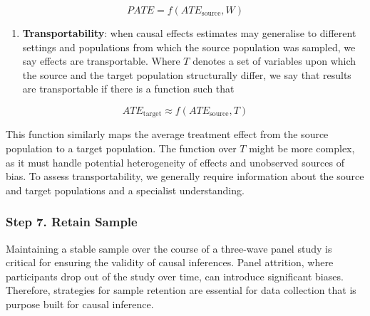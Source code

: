\documentclass[
  singlecolumn,
  9pt]{article}
\providecommand{\tightlist}{%
  \setlength{\itemsep}{0pt}\setlength{\parskip}{0pt}}\usepackage{longtable,booktabs,array}
\begin{document}
\[PATE =  f(ATE_{\text{source}}, W)\]

\begin{enumerate}
\def\labelenumi{\arabic{enumi}.}
\setcounter{enumi}{3}
\tightlist
\item
  \textbf{Transportability}: when causal effects estimates may
  generalise to different settings and populations from which the source
  population was sampled, we say effects are transportable. Where \(T\)
  denotes a set of variables upon which the source and the target
  population structurally differ, we say that results are transportable
  if there is a function such that
\end{enumerate}

\[ATE_{\text{target}} \approx f(ATE_{\text{source}}, T)\]

This function similarly maps the average treatment effect from the
source population to a target population. The function over \(T\) might
be more complex, as it must handle potential heterogeneity of effects
and unobserved sources of bias. To assess transportability, we generally
require information about the source and target populations and a
specialist understanding.

\subsubsection{Step 7. Retain Sample}\label{step-7.-retain-sample}

Maintaining a stable sample over the course of a three-wave panel study
is critical for ensuring the validity of causal inferences. Panel
attrition, where participants drop out of the study over time, can
introduce significant biases. Therefore, strategies for sample retention
are essential for data collection that is purpose built for causal
inference.
\end{document}
